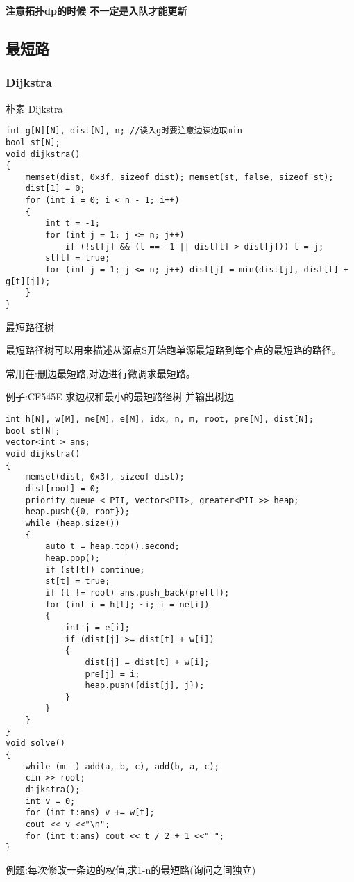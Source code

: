 \documentclass[a4paper, fontset=none]{ctexart}
\begin{document}
\textbf{注意拓扑dp的时候 不一定是入队才能更新}
\subsection{最短路}
\subsubsection{Dijkstra}
朴素 Dijkstra
\begin{verbatim}
int g[N][N], dist[N], n; //读入g时要注意边读边取min
bool st[N];
void dijkstra()
{
    memset(dist, 0x3f, sizeof dist); memset(st, false, sizeof st);
    dist[1] = 0;
    for (int i = 0; i < n - 1; i++)
    {
        int t = -1;
        for (int j = 1; j <= n; j++)
            if (!st[j] && (t == -1 || dist[t] > dist[j])) t = j;
        st[t] = true;
        for (int j = 1; j <= n; j++) dist[j] = min(dist[j], dist[t] + g[t][j]);
    }
}
\end{verbatim}

最短路径树

最短路径树可以用来描述从源点S开始跑单源最短路到每个点的最短路的路径。

常用在:删边最短路,对边进行微调求最短路。

例子:CF545E   求边权和最小的最短路径树 并输出树边

\begin{verbatim}
int h[N], w[M], ne[M], e[M], idx, n, m, root, pre[N], dist[N];
bool st[N];
vector<int > ans;
void dijkstra()
{
    memset(dist, 0x3f, sizeof dist);
    dist[root] = 0;
    priority_queue < PII, vector<PII>, greater<PII >> heap;
    heap.push({0, root});
    while (heap.size())
    {
        auto t = heap.top().second;
        heap.pop();
        if (st[t]) continue;
        st[t] = true;
        if (t != root) ans.push_back(pre[t]);
        for (int i = h[t]; ~i; i = ne[i])
        {
            int j = e[i];
            if (dist[j] >= dist[t] + w[i])
            {
                dist[j] = dist[t] + w[i];
                pre[j] = i;
                heap.push({dist[j], j});
            }
        }
    }
}
void solve()
{
    while (m--) add(a, b, c), add(b, a, c);
    cin >> root;
    dijkstra();
    int v = 0;
    for (int t:ans) v += w[t];
    cout << v <<"\n";
    for (int t:ans) cout << t / 2 + 1 <<" ";
}
\end{verbatim}

例题:每次修改一条边的权值,求1-n的最短路(询问之间独立)
\end{document}
